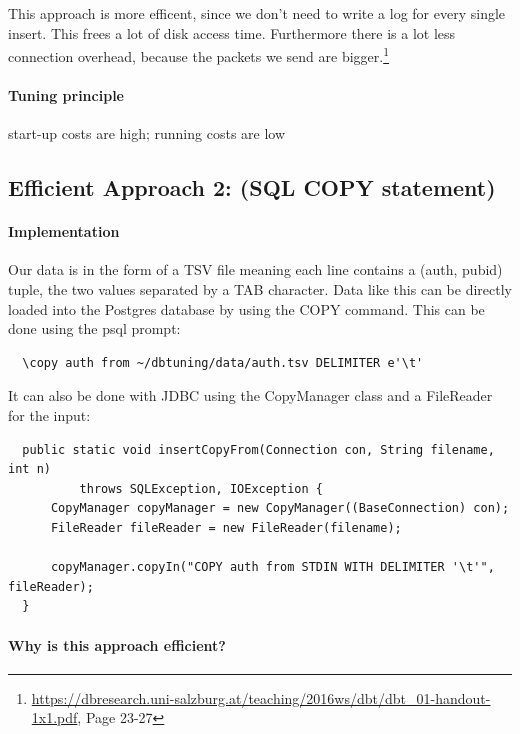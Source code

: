 \documentclass[11pt]{scrartcl}
\begin{document}
  This approach is more efficent, since we don't need to write a log for every single insert. This frees a lot of disk access time. Furthermore there is a lot less connection overhead, because the packets we send are bigger.\footnote{\url{https://dbresearch.uni-salzburg.at/teaching/2016ws/dbt/dbt_01-handout-1x1.pdf}, Page 23-27}

  \paragraph{Tuning principle}

  start-up costs are high; running costs are low

    \subsection*{Efficient Approach 2: (SQL COPY statement)}

  \paragraph{Implementation}

  Our data is in the form of a TSV file meaning each line contains a
  (auth, pubid) tuple, the two values separated by a TAB character. Data like this can be
  directly loaded into the Postgres database by using the COPY command. This can be
  done using the psql prompt:
  
  {\small
\begin{verbatim}
  \copy auth from ~/dbtuning/data/auth.tsv DELIMITER e'\t'
\end{verbatim}
}

It can also be done with JDBC using the CopyManager class and a FileReader
for the input:

{\small
\begin{verbatim}
  public static void insertCopyFrom(Connection con, String filename, int n)
          throws SQLException, IOException {
      CopyManager copyManager = new CopyManager((BaseConnection) con);
      FileReader fileReader = new FileReader(filename);
    
      copyManager.copyIn("COPY auth from STDIN WITH DELIMITER '\t'", fileReader);
  }
\end{verbatim}
}

  \paragraph{Why is this approach efficient?}
\end{document}
